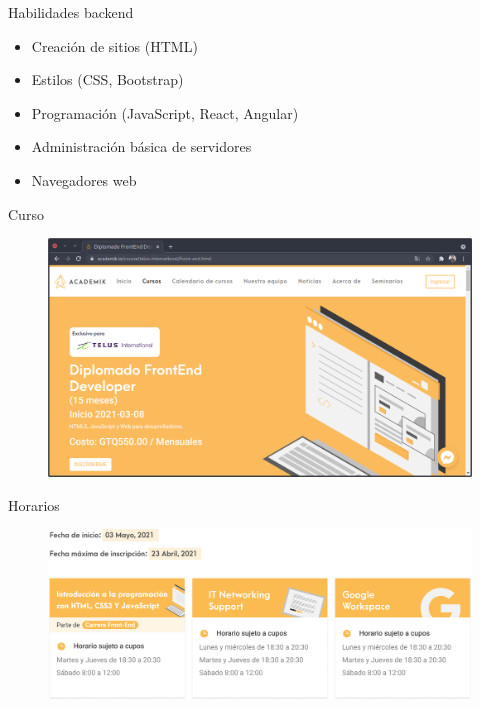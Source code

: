 \documentclass[aspectratio=169]{beamer}
\begin{document}
\begin{frame}{Habilidades backend}
	\begin{itemize}
		\item Creación de sitios (HTML)
		\item Estilos (CSS, Bootstrap)
		\item Programación (JavaScript, React, Angular)
		\item Administración básica de servidores
		\item Navegadores web
	\end{itemize}
\end{frame}


\begin{frame}{Curso}
	\begin{figure}
		\centering
		\includegraphics[width=\linewidth]{Images/curso}
	\end{figure}
\end{frame}

\begin{frame}{Horarios}
	\begin{figure}
		\centering
		\includegraphics[width=\linewidth]{Images/horarios}
	\end{figure}
\end{frame}
\end{document}
